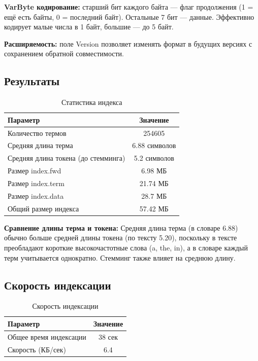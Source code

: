 \documentclass[a4paper,12pt]{article}
\begin{document}
\textbf{VarByte кодирование:} старший бит каждого байта — флаг продолжения (1 = ещё есть байты, 0 = последний байт). Остальные 7 бит — данные. Эффективно кодирует малые числа в 1 байт, большие — до 5 байт.

\textbf{Расширяемость:} поле Version позволяет изменять формат в будущих версиях с сохранением обратной совместимости.

\subsection{Результаты}
\begin{table}[H]
\centering
\begin{tabular}{|l|c|}
\hline
\textbf{Параметр} & \textbf{Значение} \\
\hline
Количество термов & 254605 \\
\hline
Средняя длина терма & 6.88 символов \\
\hline
Средняя длина токена (до стемминга) & 5.2 символов \\
\hline
Размер index.fwd & 6.98 МБ \\
\hline
Размер index.term & 21.74  МБ \\
\hline
Размер index.data & 28.7 МБ \\
\hline
Общий размер индекса & 57.42 МБ \\
\hline
\end{tabular}
\caption{Статистика индекса}
\end{table}

\textbf{Сравнение длины терма и токена:} Средняя длина терма (в словаре 6.88) обычно больше средней длины токена (по тексту 5.20), поскольку в тексте преобладают короткие высокочастотные слова (a, the, in), а в словаре каждый терм учитывается однократно. Стемминг также влияет на среднюю длину.

\subsection{Скорость индексации}
\begin{table}[H]
\centering
\begin{tabular}{|l|c|}
\hline
\textbf{Параметр} & \textbf{Значение} \\
\hline
Общее время индексации & 38 сек \\
\hline
Скорость (КБ/сек) & 6.4 \\
\hline
\end{tabular}
\caption{Скорость индексации}
\end{table}
\end{document}
